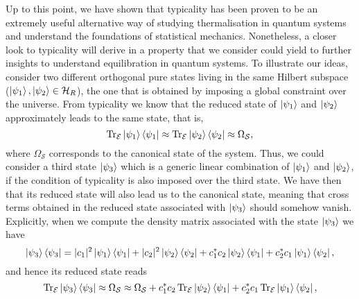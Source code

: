\indent Up to this point, we have shown that typicality has been proven to be an extremely useful alternative way of studying thermalisation in quantum systems and understand the foundations of statistical mechanics. Nonetheless, a closer look to typicality will derive in a property that we consider could yield to further insights to understand equilibration in quantum systems. To illustrate our ideas, consider two different orthogonal pure states living in the same Hilbert subspace ($\mathinner{|{\psi_1}\rangle},\mathinner{|{\psi_2}\rangle} \in \mathcal{H}_{R}$), the one that is obtained by imposing a global constraint over the universe. From typicality we know that the reduced state of $\mathinner{|{\psi_1}\rangle}$ and $\mathinner{|{\psi_2}\rangle}$ approximately leads to the same state, that is, 
\begin{equation}
\operatorname{Tr}_{\mathcal{E}}\mathinner{|{\psi_1}\rangle}\mathinner{\langle{\psi_1}|}\approx\operatorname{Tr}_{\mathcal{E}}\mathinner{|{\psi_2}\rangle}\mathinner{\langle{\psi_2}|}\approx\Omega_{\mathcal{S}},
\end{equation}
where $\Omega_{\mathcal{S}}$ corresponds to the canonical state of the system.
Thus, we could consider a third state $\mathinner{|{\psi_3}\rangle}$ which is a generic linear combination of $\mathinner{|{\psi_1}\rangle}$ and $\mathinner{|{\psi_2}\rangle}$, if the condition of typicality is also imposed over the third state. We have then that its reduced state will also lead us to the canonical state, meaning that cross terms obtained in the reduced state associated with $\mathinner{|{\psi_3}\rangle}$ should somehow vanish. Explicitly, when we compute the density matrix associated with the state $\mathinner{|{\psi_3}\rangle}$ we have 
\begin{equation}
\mathinner{|{\psi_3}\rangle}\mathinner{\langle{\psi_3}|} = |c_1|^2 \mathinner{|{\psi_1}\rangle}\mathinner{\langle{\psi_1}|} + |c_2|^2 \mathinner{|{\psi_2}\rangle}\mathinner{\langle{\psi_2}|}+c_1^*c_2\mathinner{|{\psi_2}\rangle}\mathinner{\langle{\psi_1}|} + c_2^*c_1\mathinner{|{\psi_1}\rangle}\mathinner{\langle{\psi_2}|},
\end{equation}
and hence its reduced state reads
\begin{equation}
\operatorname{Tr}_{\mathcal{E}}\mathinner{|{\psi_3}\rangle}\mathinner{\langle{\psi_3}|} \approx \Omega_{\mathcal{S}}\approx \Omega_{\mathcal{S}}+c_1^*c_2\operatorname{Tr}_{\mathcal{E}}\mathinner{|{\psi_2}\rangle}\mathinner{\langle{\psi_1}|} + c_2^*c_1\operatorname{Tr}_{\mathcal{E}}\mathinner{|{\psi_1}\rangle}\mathinner{\langle{\psi_2}|},
\label{Intro:equation_super_orthogonality}
\end{equation}
